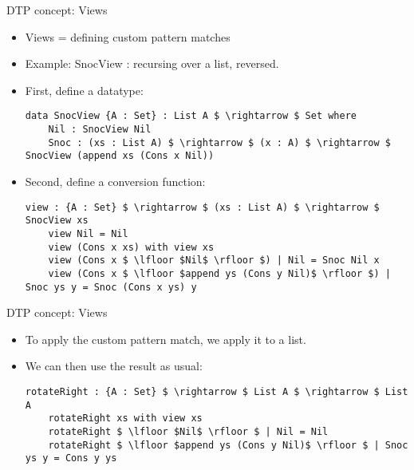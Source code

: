 \documentclass[10pt]{beamer}
\begin{document}
\begin{frame}[fragile]{DTP concept: Views}

\begin{itemize}
\item Views = defining custom pattern matches
\item Example: SnocView : recursing over a list, reversed.
\item First, define a datatype:
	\begin{lstlisting}[mathescape=true]
	data SnocView {A : Set} : List A $ \rightarrow $ Set where
	Nil : SnocView Nil
	Snoc : (xs : List A) $ \rightarrow $ (x : A) $ \rightarrow $ SnocView (append xs (Cons x Nil))
	\end{lstlisting}
\item Second, define a conversion function:
	\begin{lstlisting}[mathescape=true]
	view : {A : Set} $ \rightarrow $ (xs : List A) $ \rightarrow $ SnocView xs
	view Nil = Nil
	view (Cons x xs) with view xs
	view (Cons x $ \lfloor $Nil$ \rfloor $) | Nil = Snoc Nil x
	view (Cons x $ \lfloor $append ys (Cons y Nil)$ \rfloor $) | Snoc ys y = Snoc (Cons x ys) y
	\end{lstlisting}
\end{itemize}

\end{frame}

\begin{frame}[fragile]{DTP concept: Views}

\begin{itemize}
\item To apply the custom pattern match, we apply it to a list.
\item We can then use the result as usual:
	\begin{lstlisting}[mathescape=true]
	rotateRight : {A : Set} $ \rightarrow $ List A $ \rightarrow $ List A
	rotateRight xs with view xs
	rotateRight $ \lfloor $Nil$ \rfloor $ | Nil = Nil
	rotateRight $ \lfloor $append ys (Cons y Nil)$ \rfloor $ | Snoc ys y = Cons y ys
	\end{lstlisting}
\end{itemize}

\end{frame}
\end{document}
